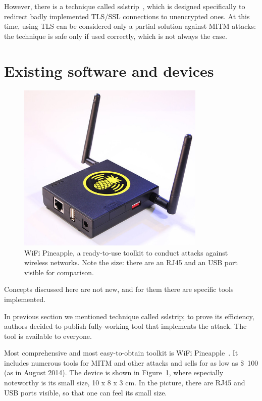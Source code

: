 \documentclass[12pt,a4paper,oneside,pdftex]{report}
\begin{document}
However, there is a technique called sslstrip~\cite{marlinspike2009new}, which is designed specifically to redirect badly implemented TLS/SSL connections to unencrypted ones. At this time, using TLS can be considered only a partial solution against MITM attacks: the technique is safe only if used correctly, which is not always the case.

\section{Existing software and devices}

\begin{figure}
    \center
    \includegraphics[width=0.8\textwidth]{images/wifi_pineapple_pic}
    \caption{WiFi Pineapple, a ready-to-use toolkit to conduct attacks against wireless networks. Note the size: there are an RJ45 and an USB port visible for comparison.}
    \label{wifi_pineapple_pic}
\end{figure}

Concepts discussed here are not new, and for them there are specific tools implemented.

In previous section we mentioned technique called sslstrip; to prove its efficiency, authors decided to publish fully-working tool that implements the attack. The tool is available to everyone.~\cite{marlinspike2009new}

Most comprehensive and most easy-to-obtain toolkit is WiFi Pineapple~\cite{wifipineapple}. It includes numerous tools for MITM and other attacks and sells for as low as \$~100 (as in August 2014). The device is shown in Figure~\ref{wifi_pineapple_pic}, where especially noteworthy is its small size, 10 x 8 x 3 cm. In the picture, there are RJ45 and USB ports visible, so that one can feel its small size.
\end{document}
